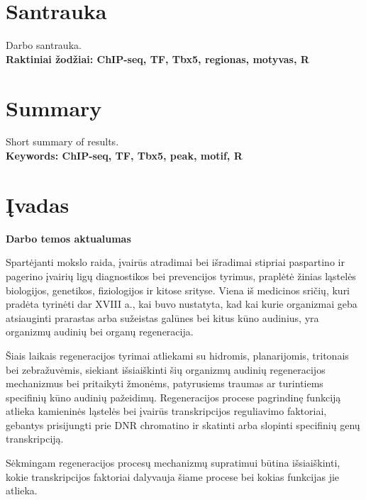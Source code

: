 \documentclass[12pt]{article}
\begin{document}
\section*{Santrauka}
Darbo santrauka.\\

\textbf{Raktiniai žodžiai: ChIP-seq, TF, Tbx5, regionas, motyvas, R}
\newpage

\section*{Summary}
Short summary of results.\\

\textbf{Keywords: ChIP-seq, TF, Tbx5, peak, motif, R}
\newpage

\section{Įvadas}

\textbf{Darbo temos aktualumas}

Spartėjanti mokslo raida, įvairūs atradimai bei išradimai stipriai
paspartino ir pagerino įvairių ligų diagnostikos bei prevencijos
tyrimus, praplėtė žinias ląstelės biologijos, genetikos, fiziologijos
ir kitose srityse. Viena iš medicinos sričių, kuri pradėta tyrinėti dar
XVIII a., kai buvo nustatyta, kad kai kurie organizmai geba atsiauginti
prarastas arba sužeistas galūnes bei kitus kūno audinius\cite{REGENERATION},
yra organizmų audinių bei organų regeneracija.

Šiais laikais regeneracijos tyrimai atliekami su hidromis, planarijomis,
tritonais bei zebražuvėmis\cite{ORGANISMS}, siekiant išsiaiškinti šių
organizmų audinių regeneracijos mechanizmus bei pritaikyti žmonėms,
patyrusiems traumas ar turintiems specifinių kūno audinių pažeidimų.
Regeneracijos procese pagrindinę funkciją atlieka kamieninės ląstelės
bei įvairūs transkripcijos reguliavimo faktoriai, gebantys prisijungti
prie DNR chromatino ir skatinti arba slopinti specifinių genų transkripciją.

Sėkmingam regeneracijos procesų mechanizmų supratimui būtina išsiaiškinti,
kokie transkripcijos faktoriai dalyvauja šiame procese bei kokias funkcijas
jie atlieka.
\hfill \break
\end{document}

